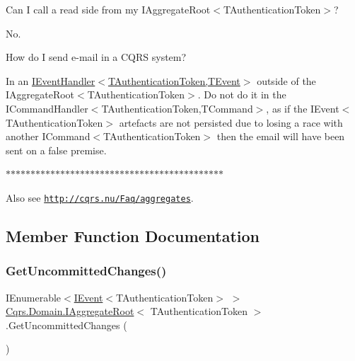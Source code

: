 Can I call a read side from my I\+Aggregate\+Root$<$\+T\+Authentication\+Token$>$? 

No. 

How do I send e-\/mail in a C\+Q\+RS system? 

In an \hyperlink{interfaceCqrs_1_1Events_1_1IEventHandler}{I\+Event\+Handler$<$\+T\+Authentication\+Token,\+T\+Event$>$} outside of the I\+Aggregate\+Root$<$\+T\+Authentication\+Token$>$. Do not do it in the I\+Command\+Handler$<$\+T\+Authentication\+Token,\+T\+Command$>$, as if the I\+Event$<$\+T\+Authentication\+Token$>$ artefacts are not persisted due to losing a race with another I\+Command$<$\+T\+Authentication\+Token$>$ then the email will have been sent on a false premise. 

$\ast$$\ast$$\ast$$\ast$$\ast$$\ast$$\ast$$\ast$$\ast$$\ast$$\ast$$\ast$$\ast$$\ast$$\ast$$\ast$$\ast$$\ast$$\ast$$\ast$$\ast$$\ast$$\ast$$\ast$$\ast$$\ast$$\ast$$\ast$$\ast$$\ast$$\ast$$\ast$$\ast$$\ast$$\ast$$\ast$$\ast$$\ast$$\ast$$\ast$$\ast$$\ast$$\ast$$\ast$ 

Also see \href{http://cqrs.nu/Faq/aggregates}{\tt http\+://cqrs.\+nu/\+Faq/aggregates}. 

\subsection{Member Function Documentation}
\mbox{\label{interfaceCqrs_1_1Domain_1_1IAggregateRoot_a22fda414613f5ac0d4371554d7d6473b_a22fda414613f5ac0d4371554d7d6473b}} 
\subsubsection{\texorpdfstring{Get\+Uncommitted\+Changes()}{GetUncommittedChanges()}}
{\footnotesize\ttfamily I\+Enumerable$<$\hyperlink{interfaceCqrs_1_1Events_1_1IEvent}{I\+Event}$<$T\+Authentication\+Token$>$ $>$ \hyperlink{interfaceCqrs_1_1Domain_1_1IAggregateRoot}{Cqrs.\+Domain.\+I\+Aggregate\+Root}$<$ T\+Authentication\+Token $>$.Get\+Uncommitted\+Changes (\begin{DoxyParamCaption}{ }\end{DoxyParamCaption})}



